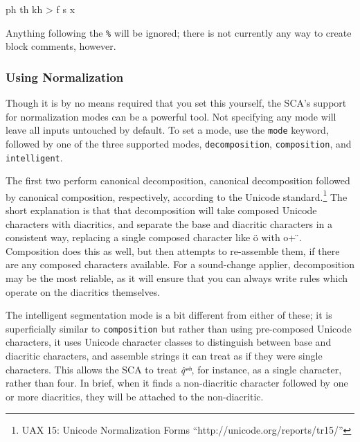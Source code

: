 \documentclass[10pt,letterpaper]{article}
\newcounter{excounter}
\newenvironment{vex}[1]{
	\vspace{1em}
	\refstepcounter{excounter}
	\noindent\makebox[3em][l]{(\arabic{excounter}\label{#1})}
	\minipage{\textwidth}
	\verbatim
}{
	\endverbatim
	\endminipage
	\vspace{1em}
}
\begin{document}
\begin{vex}{ex:comment}
ph th kh > f s x %
\end{vex}

\noindent
Anything following the \texttt{\%} will be ignored; there is not currently any way to create block comments, however. 


\subsubsection{Using Normalization} 
\label{ssub:using_normalization}
Though it is by no means required that you set this yourself, the SCA's support for normalization modes can be a powerful tool. Not specifying any mode will leave all inputs untouched by default. To set a mode, use the \texttt{mode} keyword, followed by one of the three supported modes, \texttt{decomposition}, \texttt{composition}, and \texttt{intelligent}.

The first two perform canonical decomposition, canonical decomposition followed by canonical composition, respectively, according to the Unicode standard.\footnote{UAX 15: Unicode Normalization Forms ``http://unicode.org/reports/tr15/''} The short explanation is that that decomposition will take composed Unicode characters with diacritics, and separate the base and diacritic characters in a consistent way, replacing a single composed character like ö with o+ ̈. Composition does this as well, but then attempts to re-assemble them, if there are any composed characters available. For a sound-change applier, decomposition may be the most reliable, as it will ensure that you can always write rules which operate on the diacritics themselves.


The intelligent segmentation mode is a bit different from either of these; it is superficially similar to \texttt{composition} but rather than using pre-composed Unicode characters, it uses Unicode character classes to distinguish between base and diacritic characters, and assemble strings it can treat as if they were single characters. This allows the SCA to treat \emph{q̇ʷʰ}, for instance, as a single character, rather than four. In brief, when it finds a non-diacritic character followed by one or more diacritics, they will be attached to the non-diacritic.
\end{document}
